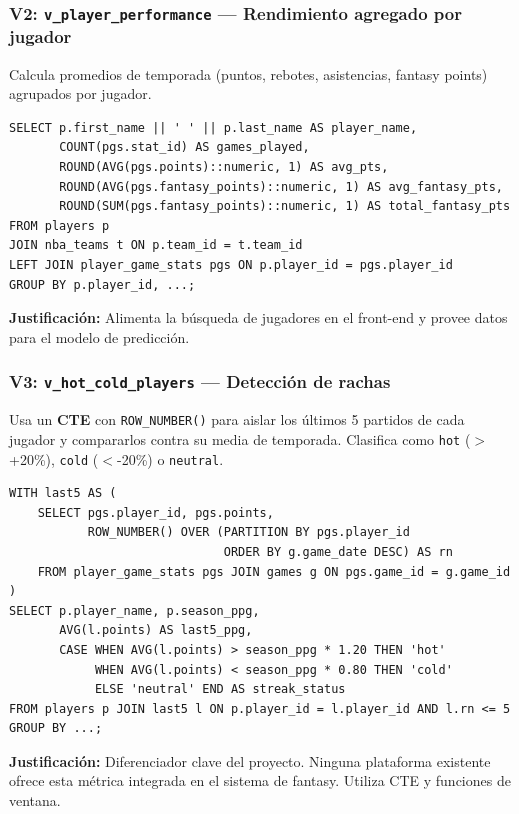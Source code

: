 \documentclass[12pt,a4paper]{article}
\begin{document}
\subsubsection{V2: \texttt{v\_player\_performance} --- Rendimiento agregado por jugador}

Calcula promedios de temporada (puntos, rebotes, asistencias, fantasy points) agrupados por jugador.

\begin{lstlisting}
SELECT p.first_name || ' ' || p.last_name AS player_name,
       COUNT(pgs.stat_id) AS games_played,
       ROUND(AVG(pgs.points)::numeric, 1) AS avg_pts,
       ROUND(AVG(pgs.fantasy_points)::numeric, 1) AS avg_fantasy_pts,
       ROUND(SUM(pgs.fantasy_points)::numeric, 1) AS total_fantasy_pts
FROM players p
JOIN nba_teams t ON p.team_id = t.team_id
LEFT JOIN player_game_stats pgs ON p.player_id = pgs.player_id
GROUP BY p.player_id, ...;
\end{lstlisting}

\textbf{Justificaci\'on:} Alimenta la b\'usqueda de jugadores en el front-end y provee datos
para el modelo de predicci\'on.

\subsubsection{V3: \texttt{v\_hot\_cold\_players} --- Detecci\'on de rachas}

Usa un \textbf{CTE} con \texttt{ROW\_NUMBER()} para aislar los \'ultimos 5 partidos de cada jugador
y compararlos contra su media de temporada. Clasifica como \texttt{hot} ($>$+20\%), \texttt{cold} ($<$-20\%)
o \texttt{neutral}.

\begin{lstlisting}
WITH last5 AS (
    SELECT pgs.player_id, pgs.points,
           ROW_NUMBER() OVER (PARTITION BY pgs.player_id
                              ORDER BY g.game_date DESC) AS rn
    FROM player_game_stats pgs JOIN games g ON pgs.game_id = g.game_id
)
SELECT p.player_name, p.season_ppg,
       AVG(l.points) AS last5_ppg,
       CASE WHEN AVG(l.points) > season_ppg * 1.20 THEN 'hot'
            WHEN AVG(l.points) < season_ppg * 0.80 THEN 'cold'
            ELSE 'neutral' END AS streak_status
FROM players p JOIN last5 l ON p.player_id = l.player_id AND l.rn <= 5
GROUP BY ...;
\end{lstlisting}

\textbf{Justificaci\'on:} Diferenciador clave del proyecto. Ninguna plataforma existente ofrece
esta m\'etrica integrada en el sistema de fantasy. Utiliza CTE y funciones de ventana.
\end{document}

